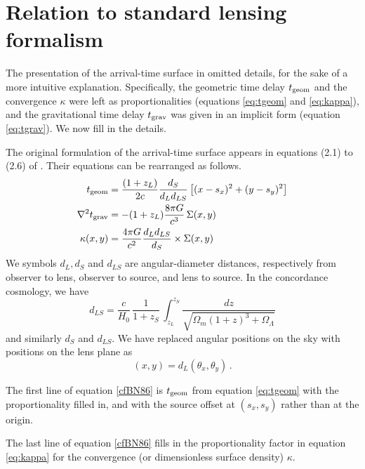 \appendix

\section{Relation to standard lensing formalism} \label{sec:more-theory}

The presentation of the arrival-time surface in 
omitted details, for the sake of a more intuitive explanation.
Specifically, the geometric time delay $t_{\rm geom}$ and the
convergence $\kappa$ were left as proportionalities (equations
\ref{eq:tgeom} and \ref{eq:kappa}), and the gravitational time delay
$t_{\rm grav}$ was given in an implicit form (equation
\ref{eq:tgrav}).  We now fill in the details.

The original formulation of the arrival-time surface appears in
equations (2.1) to (2.6) of \cite{1986ApJ...310..568B}.  Their
equations can be rearranged as follows.
\begin{equation} \label{cfBN86}
\begin{aligned}
t_{\rm geom} &= \frac{(1+z_L)}{2c} \frac{d_S}{d_L d_{LS}}
\left[ (x-s_x)^2 + (y-s_y)^2 \right] \\
\nabla^2 t_{\rm grav} &= -(1+z_L)\frac{8\pi G}{c^3} \, \Sigma(x,y) \\
\kappa(x,y) &= \frac{4\pi G}{c^2} \frac{d_L d_{LS}}{d_S}
               \times \Sigma(x,y)
\end{aligned}
\end{equation}
We symbols $d_L,d_S$ and $d_{LS}$ are angular-diameter distances,
respectively from observer to lens, observer to source, and lens to
source.  In the concordance cosmology, we have
\begin{equation}
d_{LS} = \frac{c}{H_0}\,\frac1{1+z_S} \,
\int_{z_L}^{z_S} \!\! \frac{dz}{\sqrt{\Omega_m(1+z)^3 + \Omega_\Lambda}}
\end{equation}
and similarly $d_S$ and $d_{LS}$.  We have replaced angular positions
on the sky with positions on the lens plane as
\begin{equation}
(x,y) = d_L (\theta_x,\theta_y) \,.
\end{equation}

The first line of equation \eqref{cfBN86} is $t_{\rm geom}$ from
equation \eqref{eq:tgeom} with the proportionality filled in, and with
the source offset at $(s_x,s_y)$ rather than at the origin.

The last line of equation \eqref{cfBN86} fills in the proportionality
factor in equation \eqref{eq:kappa} for the convergence (or
dimensionless surface density) $\kappa$.

